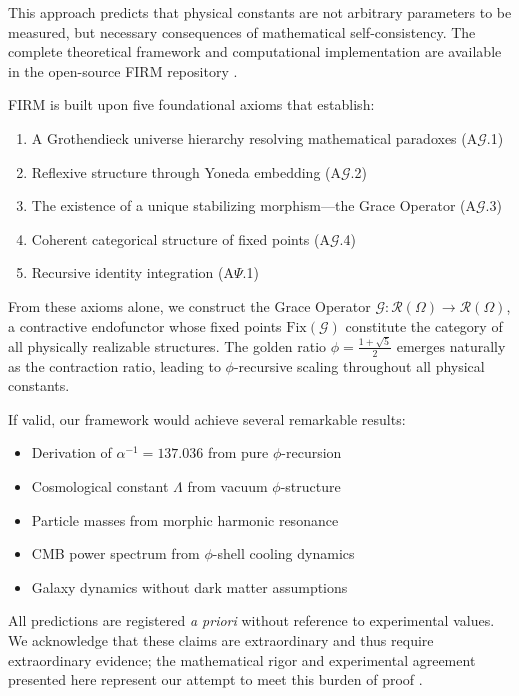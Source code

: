 \documentclass[12pt]{article}
\newcommand{\G}{\mathcal{G}}                %
\newcommand{\R}{\mathcal{R}}                %
\newcommand{\IdentityOp}{\Psi}              %
\newcommand{\Fix}{\text{Fix}}               %
\begin{document}
This approach predicts that physical constants are not arbitrary parameters to be measured, but necessary consequences of mathematical self-consistency. The complete theoretical framework and computational implementation are available in the open-source FIRM repository \cite{FIRM2024}.

FIRM is built upon five foundational axioms that establish:
\begin{enumerate}
    \item A Grothendieck universe hierarchy resolving mathematical paradoxes (A$\mathcal{G}$.1)
    \item Reflexive structure through Yoneda embedding (A$\mathcal{G}$.2)  
    \item The existence of a unique stabilizing morphism---the Grace Operator (A$\mathcal{G}$.3)
    \item Coherent categorical structure of fixed points (A$\mathcal{G}$.4)
    \item Recursive identity integration (A$\IdentityOp$.1)
\end{enumerate}

From these axioms alone, we construct the Grace Operator $\G: \R(\Omega) \to \R(\Omega)$, a contractive endofunctor whose fixed points $\Fix(\G)$ constitute the category of all physically realizable structures. The golden ratio $\phi = \frac{1+\sqrt{5}}{2}$ emerges naturally as the contraction ratio, leading to $\phi$-recursive scaling throughout all physical constants.

If valid, our framework would achieve several remarkable results:
\begin{itemize}
    \item Derivation of $\alpha^{-1} = 137.036$ from pure $\phi$-recursion
    \item Cosmological constant $\Lambda$ from vacuum $\phi$-structure  
    \item Particle masses from morphic harmonic resonance
    \item CMB power spectrum from $\phi$-shell cooling dynamics
    \item Galaxy dynamics without dark matter assumptions
\end{itemize}

All predictions are registered \emph{a priori} without reference to experimental values. We acknowledge that these claims are extraordinary and thus require extraordinary evidence; the mathematical rigor and experimental agreement presented here represent our attempt to meet this burden of proof \citep{Planck2018, DESI2024, PantheonPlus2022}.
\end{document}
